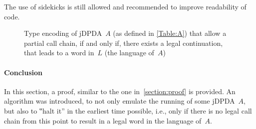 \documentclass[a4paper,USenglish]{lipics-v2016}
\begin{document}
The use of sidekicks is still allowed and recommended to improve readability of code.

\begin{figure}[ht]
  \caption{\label{Figure:prefix-A}Type encoding of jDPDA~$A$ (as defined in \cref{Table:A})
    that allow a partial call chain, if and only if, there exists a legal continuation, that
    leads to a word in~$L$ (the language of~$A$)}
\end{figure}

\paragraph*{Conclusion}
In this section, a proof, similar to the one in~\cref{section:proof} is provided.
An algorithm was introduced, to not only emulate the running of some jDPDA~$A$,
  but also to ‟halt it” in the earliest time possible, i.e., only if there is
  no legal call chain from this point to result in a legal word in the language of~$A$.
 
\end{document}
